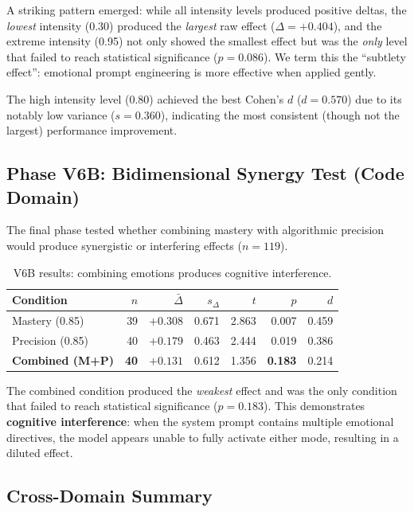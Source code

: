 \documentclass[lineno]{wlpeerj}
\begin{document}
A striking pattern emerged: while all intensity levels produced positive deltas, the \textit{lowest} intensity (0.30) produced the \textit{largest} raw effect ($\Delta = +0.404$), and the extreme intensity (0.95) not only showed the smallest effect but was the \textit{only} level that failed to reach statistical significance ($p = 0.086$). We term this the ``subtlety effect'': emotional prompt engineering is more effective when applied gently.

The high intensity level (0.80) achieved the best Cohen's $d$ ($d = 0.570$) due to its notably low variance ($s = 0.360$), indicating the most consistent (though not the largest) performance improvement.

\subsection{Phase V6B: Bidimensional Synergy Test (Code Domain)}

The final phase tested whether combining mastery with algorithmic precision would produce synergistic or interfering effects ($n = 119$).

\begin{table}[H]
\centering
\caption{V6B results: combining emotions produces cognitive interference.}
\label{tab:v6b}
\begin{tabular}{@{}lrrrrrr@{}}
\toprule
\textbf{Condition} & \textbf{$n$} & $\bar{\Delta}$ & $s_\Delta$ & $t$ & $p$ & $d$ \\
\midrule
Mastery (0.85) & 39 & $+0.308$ & 0.671 & 2.863 & 0.007 & 0.459 \\
Precision (0.85) & 40 & $+0.179$ & 0.463 & 2.444 & 0.019 & 0.386 \\
\textbf{Combined (M+P)} & \textbf{40} & $+0.131$ & 0.612 & 1.356 & \textbf{0.183} & 0.214 \\
\bottomrule
\end{tabular}
\end{table}

The combined condition produced the \textit{weakest} effect and was the only condition that failed to reach statistical significance ($p = 0.183$). This demonstrates \textbf{cognitive interference}: when the system prompt contains multiple emotional directives, the model appears unable to fully activate either mode, resulting in a diluted effect.

\subsection{Cross-Domain Summary}
\end{document}
